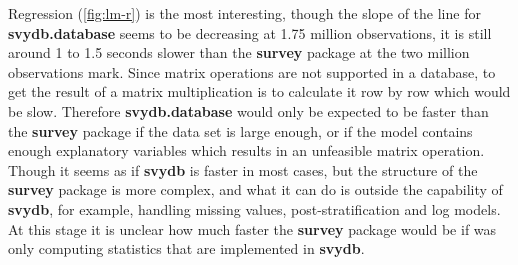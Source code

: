 Regression (\autoref{fig:lm-r}) is the most interesting, though the slope of the line for {\bf svydb.database} seems to be decreasing at 1.75 million observations, it is still around 1 to 1.5 seconds slower than the {\bf survey} package at the two million observations mark. Since matrix operations are not supported in a database, to get the result of a matrix multiplication is to calculate it row by row which would be slow. Therefore {\bf svydb.database} would only be expected to be faster than the {\bf survey} package if the data set is large enough, or if the model contains enough explanatory variables which results in an unfeasible matrix operation.\\

Though it seems as if {\bf svydb} is faster in most cases, but the structure of the {\bf survey} package is more complex, and what it can do is outside the capability of {\bf svydb}, for example, handling missing values, post-stratification and log models. At this stage it is unclear how much faster the {\bf survey} package would be if was only computing statistics that are implemented in {\bf svydb}.











